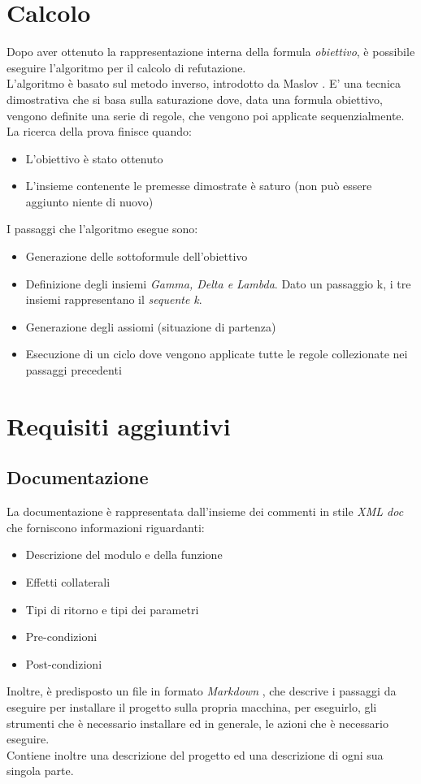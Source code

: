 \documentclass[\main/tesi.tex]{subfiles}
\begin{document}
\section{Calcolo}
Dopo aver ottenuto la rappresentazione interna della formula \textit{obiettivo}, è possibile eseguire l'algoritmo per il calcolo di refutazione. \\
L'algoritmo è basato sul metodo inverso, introdotto da Maslov \cite{Maslov:67}. E' una tecnica dimostrativa che si basa sulla saturazione dove, data una formula obiettivo, vengono definite una serie di regole, che vengono poi applicate sequenzialmente. \\
La ricerca della prova finisce quando:
\begin{itemize}
  \item L'obiettivo è stato ottenuto
  \item L'insieme contenente le premesse dimostrate è saturo (non può essere aggiunto niente di nuovo)
\end{itemize}
I passaggi che l'algoritmo esegue sono:
\begin{itemize}
  \item Generazione delle sottoformule dell'obiettivo
  \item Definizione degli insiemi \textit{Gamma, Delta e Lambda}. Dato un passaggio k, i tre insiemi rappresentano il \textit{sequente k}.
  \item Generazione degli assiomi (situazione di partenza)
  \item Esecuzione di un ciclo dove vengono applicate tutte le regole collezionate nei passaggi precedenti
\end{itemize}

\section{Requisiti aggiuntivi}

\subsection{Documentazione}
\label{documentation}
La documentazione è rappresentata dall'insieme dei commenti in stile \textit{XML doc} \cite{xml} che forniscono informazioni riguardanti:
\begin{itemize}
  \item Descrizione del modulo e della funzione
  \item Effetti collaterali
  \item Tipi di ritorno e tipi dei parametri
  \item Pre-condizioni
  \item Post-condizioni
\end{itemize}
Inoltre, è predisposto un file in formato \textit{Markdown} \cite{markdown}, che descrive i passaggi da eseguire per installare il progetto sulla propria macchina, per eseguirlo, gli strumenti che è necessario installare ed in generale, le azioni che è necessario eseguire. \\
Contiene inoltre una descrizione del progetto ed una descrizione di ogni sua singola parte. \\
\end{document}

